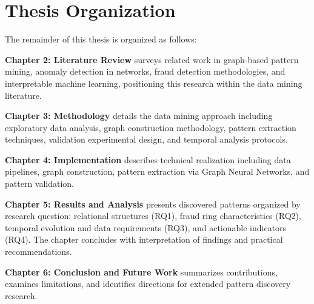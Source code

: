 \section{Thesis Organization}
\label{sec:1_5}

The remainder of this thesis is organized as follows:

\textbf{Chapter 2: Literature Review} surveys related work in graph-based pattern mining, anomaly detection in networks, fraud detection methodologies, and interpretable machine learning, positioning this research within the data mining literature.

\textbf{Chapter 3: Methodology} details the data mining approach including exploratory data analysis, graph construction methodology, pattern extraction techniques, validation experimental design, and temporal analysis protocols.

\textbf{Chapter 4: Implementation} describes technical realization including data pipelines, graph construction, pattern extraction via Graph Neural Networks, and pattern validation.

\textbf{Chapter 5: Results and Analysis} presents discovered patterns organized by research question: relational structures (RQ1), fraud ring characteristics (RQ2), temporal evolution and data requirements (RQ3), and actionable indicators (RQ4). The chapter concludes with interpretation of findings and practical recommendations.

\textbf{Chapter 6: Conclusion and Future Work} summarizes contributions, examines limitations, and identifies directions for extended pattern discovery research.
